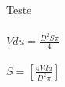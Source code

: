 \documentclass[48pt]{article}
\begin{document}
Teste\\\\
$ Vdu = \frac{D^{2} S \pi}{4} $ \\\\
$ S = \left[ \frac{4 Vdu}{D^{2} \pi}\right] $
\end{document}
